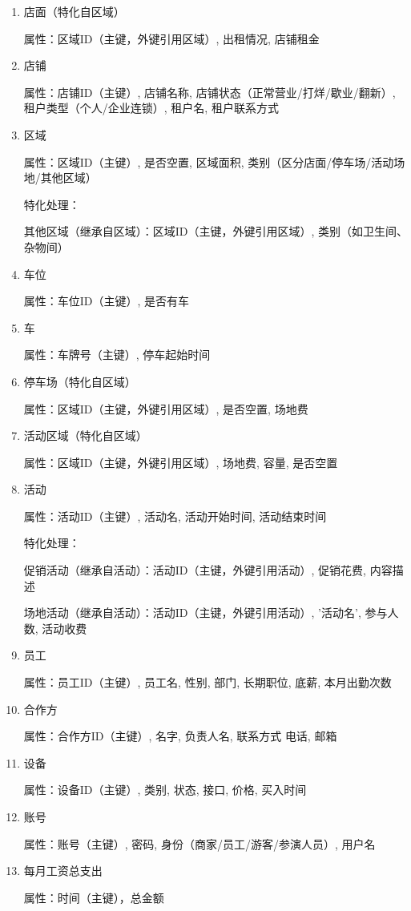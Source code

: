 \documentclass[]{article}
\providecommand{\tightlist}{%
  \setlength{\itemsep}{0pt}\setlength{\parskip}{0pt}}
\begin{document}
\begin{enumerate}
\def\labelenumi{\arabic{enumi}.}
\tightlist
\item
  店面（特化自区域）

  属性：区域ID（主键，外键引用区域）, 出租情况, 店铺租金
\item
  店铺

  属性：店铺ID（主键）, 店铺名称, 店铺状态（正常营业/打烊/歇业/翻新）,
  租户类型（个人/企业连锁）, 租户名, 租户联系方式
\item
  区域

  属性：区域ID（主键）, 是否空置, 区域面积, 类别（区分店面/停车场/活动场地/其他区域）

  特化处理：

  其他区域（继承自区域）：区域ID（主键，外键引用区域）,
  类别（如卫生间、杂物间）
\item
  车位

  属性：车位ID（主键）, 是否有车
\item
  车

  属性：车牌号（主键）, 停车起始时间
\item
  停车场（特化自区域）

  属性：区域ID（主键，外键引用区域）, 是否空置, 场地费
\item
  活动区域（特化自区域）

  属性：区域ID（主键，外键引用区域）, 场地费, 容量, 是否空置
\item
  活动

  属性：活动ID（主键）, 活动名, 活动开始时间, 活动结束时间

  特化处理：

  促销活动（继承自活动）：活动ID（主键，外键引用活动）, 促销花费, 内容描述

  场地活动（继承自活动）：活动ID（主键，外键引用活动）, '活动名', 参与人数,
  活动收费
\item
  员工

  属性：员工ID（主键）, 员工名, 性别, 部门, 长期职位, 底薪, 本月出勤次数
\item
  合作方

  属性：合作方ID（主键）, 名字, 负责人名, 联系方式 {电话, 邮箱}
\item
  设备

  属性：设备ID（主键）, 类别, 状态, 接口, 价格, 买入时间
\item
  账号

  属性：账号（主键）, 密码, 身份（商家/员工/游客/参演人员）, 用户名
\item
  每月工资总支出

  属性：时间（主键），总金额
\end{enumerate}
\end{document}
